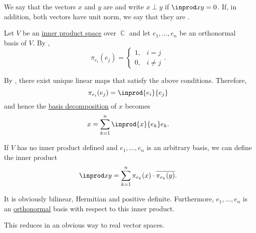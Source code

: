 \begin{definition}\label{def:orthogonality}\mimprovised
  We say that the vectors \( x \) and \( y \) are  and write \( x \perp y \) if \( \inprod x y = 0 \). If, in addition, both vectors have unit norm, we say that they are .
\end{definition}

\begin{remark}\label{rem:inner_product_basis_decomposition}
  Let \( V \) be an \hyperref[def:inner_product_space]{inner product space} over \( \BbbC \) and let \( e_1, \ldots, e_n \) be an orthonormal basis of \( V \). By ,
  \begin{equation*}
    \pi_{e_i}(e_j) = \begin{cases}
      1, &i = j \\
      0, &i \neq j
    \end{cases}.
  \end{equation*}

  By , there exist unique linear maps that satisfy the above conditions. Therefore,
  \begin{equation*}
    \pi_{e_i}(e_j) = \inprod {e_i} {e_j}
  \end{equation*}
  and hence the \hyperref[def:basis_decomposition]{basis decomposition} of \( x \) becomes
  \begin{equation}\label{eq:rem:inner_product_basis_decomposition/decomposition}
    x = \sum_{k=1}^n \inprod {x} {e_k} e_k.
  \end{equation}

  If \( V \) has no inner product defined and \( e_1, \ldots, e_n \) is an arbitrary basis, we can define the inner product
  \begin{equation}\label{eq:rem:inner_product_basis_decomposition/product}
    \inprod x y = \sum_{k=1}^n \pi_{e_k}(x) \cdot \oline{\pi_{e_k}(y)}.
  \end{equation}

  It is obviously bilinear, Hermitian and positive definite. Furthermore, \( e_1, \ldots, e_n \) is an \hyperref[def:orthogonality]{orthonormal} basis with respect to this inner product.

  This reduces in an obvious way to real vector spaces.
\end{remark}

